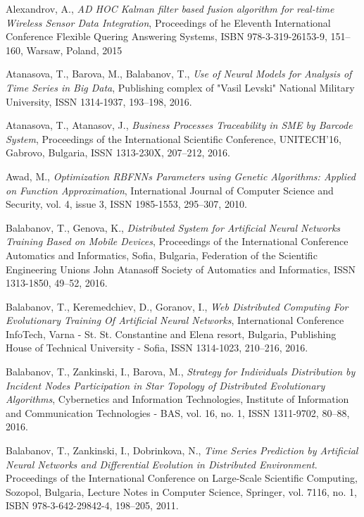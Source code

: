 \documentclass{llncs}
\begin{document}
\begin{thebibliography}{99}

 Alexandrov, A., \textit{AD HOC Kalman filter based fusion algorithm for real-time Wireless Sensor Data Integration}, Proceedings of he Eleventh International Conference Flexible Quering Answering Systems, ISBN 978-3-319-26153-9, 151--160, Warsaw, Poland, 2015

 Atanasova, T., Barova, M., Balabanov, T., \textit{Use of Neural Models for Analysis of Time Series in Big Data}, Publishing complex of "Vasil Levski" National Military University, ISSN 1314-1937, 193--198, 2016.

 Atanasova, T., Atanasov, J., \textit{Business Processes Traceability in SME by Barcode System}, Proceedings of the International Scientific Conference, UNITECH’16, Gabrovo, Bulgaria, ISSN 1313-230X,  207--212, 2016.

 Awad, M., \textit{Optimization RBFNNs Parameters using Genetic Algorithms: Applied on Function Approximation}, International Journal of Computer Science and Security, vol. 4, issue 3, ISSN 1985-1553, 295--307, 2010.

 Balabanov, T., Genova, K., \textit{Distributed System for Artificial Neural Networks Training Based on Mobile Devices}, Proceedings of the International Conference Automatics and Informatics, Sofia, Bulgaria, Federation of the Scientific Engineering Unions John Atanasoff Society of Automatics and Informatics, ISSN 1313-1850, 49--52, 2016.

 Balabanov, T., Keremedchiev, D., Goranov, I., \textit{Web Distributed Computing For Evolutionary Training Of Artificial Neural Networks}, International Conference InfoTech, Varna - St. St. Constantine and Elena resort, Bulgaria, Publishing House of Technical University - Sofia, ISSN 1314-1023, 210--216, 2016.

 Balabanov, T., Zankinski, I., Barova, M., \textit{Strategy for Individuals Distribution by Incident Nodes Participation in Star Topology of Distributed Evolutionary Algorithms}, Cybernetics and Information Technologies, Institute of Information and Communication Technologies - BAS, vol. 16, no. 1, ISSN 1311-9702, 80--88, 2016.

 Balabanov, T., Zankinski, I., Dobrinkova, N., \textit{Time Series Prediction by Artificial Neural Networks and Differential Evolution in Distributed Environment}. Proceedings of the International Conference on Large-Scale Scientific Computing, Sozopol, Bulgaria, Lecture Notes in Computer Science, Springer, vol. 7116, no. 1, ISBN 978-3-642-29842-4, 198–205, 2011. 


\end{thebibliography}
\end{document}
